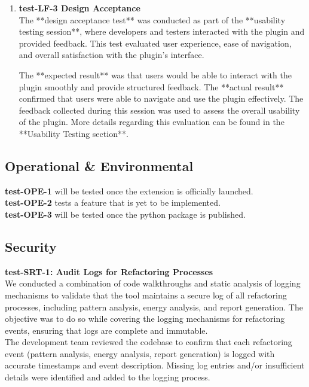 \documentclass[12pt, titlepage]{article}
\begin{document}
\begin{enumerate}
\item \textbf{test-LF-3 Design Acceptance} \\[2mm]
The **design acceptance test** was conducted as part of the **usability testing session**, where developers and testers interacted with the plugin and provided feedback. This test evaluated user experience, ease of navigation, and overall satisfaction with the plugin’s interface.

The **expected result** was that users would be able to interact with the plugin smoothly and provide structured feedback. The **actual result** confirmed that users were able to navigate and use the plugin effectively. The feedback collected during this session was used to assess the overall usability of the plugin. More details regarding this evaluation can be found in the **Usability Testing section**.

\end{enumerate}

\subsection{Operational \& Environmental}

\textbf{test-OPE-1} will be tested once the extension is officially launched.\\[2mm]

\noindent
\textbf{test-OPE-2} tests a feature that is yet to be implemented. \\[2mm]

\noindent
\textbf{test-OPE-3} will be tested once the python package is published.

\subsection{Security}

\textbf{test-SRT-1: Audit Logs for Refactoring Processes} \\[2mm]
We conducted a combination of code walkthroughs and static analysis of logging mechanisms to validate that the tool maintains a secure log of all refactoring processes, including pattern analysis, energy analysis, and report generation. The objective was to do so while covering the logging mechanisms for refactoring events, ensuring that logs are complete and immutable.\\

\noindent The development team reviewed the codebase to confirm that each refactoring event (pattern analysis, energy analysis, report generation) is logged with accurate timestamps and event description. Missing log entries and/or insufficient details were identified and added to the logging process.\\
\end{document}
